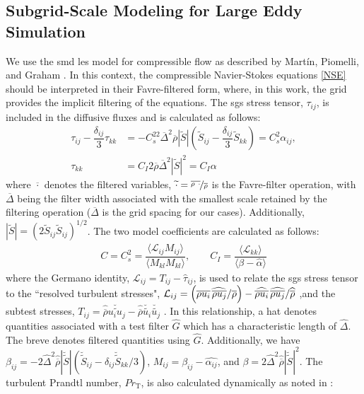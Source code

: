 \subsection{Subgrid-Scale Modeling for Large Eddy Simulation}
We use the \gls{smd} \gls{les} model for compressible flow as described by Mart\'{i}n, Piomelli, and Graham \cite{LES_Comp}. In this context, the compressible Navier-Stokes equations \ref{NSE} should be interpreted in their Favre-filtered form, where, in this work, the grid provides the implicit filtering of the equations. The \gls{sgs} stress tensor, $\tau_{ij}$, is included in the diffusive fluxes and is calculated as follows:
\begin{equation}
\begin{aligned}
	\tau_{ij} - \dfrac{\delta_{ij}}{3}\tau_{kk} &= -C_s^22\overline{\Delta}^2 \overline{\rho} |\widetilde{S}| \left( \widetilde{S}_{ij} - \dfrac{\delta_{ij}}{3} \widetilde{S}_{kk} \right) = C_s^2 \alpha_{ij},  \\
	 \tau_{kk} &= C_I 2\overline{\rho} \overline{\Delta}^2 |\widetilde{S}|^2 = C_I \alpha
\end{aligned}
\end{equation}
where $\overline{\cdot}$ denotes the filtered variables, $\widetilde{\cdot}  = \nicefrac{\overline{\rho~\cdot}}{\overline{\rho}}$ is the Favre-filter operation, with $\overline{\Delta}$ being the filter width associated with the smallest scale retained by the filtering operation ($\overline{\Delta}$ is the grid spacing for our cases). Additionally, $|\widetilde{S}| = (2\widetilde{S}_{ij}\widetilde{S}_{ij})^{1/2}$. The two model coefficients are calculated as follows:
\begin{equation}
\begin{aligned}
	C = C_s^2 = \dfrac{\langle \mathcal{L}_{ij} M_{ij} \rangle}{\langle M_{kl}M_{kl} \rangle}, \quad \quad C_I = \dfrac{ \langle \mathcal{L}_{kk} \rangle}{\langle \beta - \widehat{\alpha} \rangle}
\end{aligned}
\end{equation}
where the Germano identity, $\mathcal{L}_{ij} = T_{ij} - \widehat{\tau}_{ij}$, is used to relate the \gls{sgs} stress tensor to the ``resolved turbulent stresses", $\mathcal{L}_{ij} = \left( \overline{\rho u_i} \widehat{ \hspace{1.5pt} \overline{\rho u_j}}/\overline{\rho} \right) - \widehat{ \overline{\rho u_i}} \hspace{1.5pt} \widehat{\overline{\rho u_j}}/\widehat{\overline{\rho}}$ ,and the subtest stresses, $T_{ij} = \widehat{\overline{\rho}} \breve{\widetilde{u_i u_j}} - \widehat{\overline{\rho}} \breve{\widetilde{u_i}} \breve{\widetilde{u_j}}$ \cite{germano}. In this relationship, a hat denotes quantities associated with a test filter $\widehat{G}$ which has a characteristic length of $\widehat{\Delta}$. The breve denotes filtered quantities using $\widehat{G}$. Additionally, we have $\beta_{ij} = -2\widehat{\Delta}^2 \widehat{\overline{\rho}} |\breve{\widetilde{S}}| \left( \breve{\widetilde{S}}_{ij} - \delta_{ij} \breve{\widetilde{S}}_{kk}/3  \right)$, $M_{ij} = \beta_{ij} - \widehat{\alpha_{ij}}$, and $\beta = 2 \widehat{\Delta}^2  \widehat{\overline{\rho}} |\breve{\widetilde{S}}|^2 $. The turbulent Prandtl number, $Pr_\text{T}$, is also calculated dynamically as noted in \cite{LES_Comp}:
